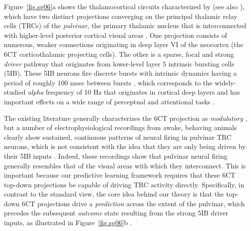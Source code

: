 \documentclass[11pt,twoside]{article}
\newif\myifpdf
\begin{document}

Figure~\ref{fig.sg06}a shows the thalamocortical circuits characterized by \citet{ShermanGuillery06} (see also \citealp{ShermanGuillery13,UsreySherman18}), which have two distinct projections converging on the principal thalamic relay cells (TRCs) of the \emph{pulvinar}, the primary thalamic nucleus that is interconnected with higher-level posterior cortical visual areas \citep{Shipp03,ArcaroPinskKastner15,HalassaKastner17}.  One projection consists of numerous, weaker connections originating in deep layer VI of the neocortex (the 6CT corticothalamic projecting cells).  The other is a sparse, focal \citep{Rockland98a,Rockland96} and strong \emph{driver} pathway that originates from lower-level layer 5 intrinsic bursting cells (5IB).  These 5IB neurons fire discrete bursts with intrinsic dynamics having a period of roughly 100 msec between bursts \citep{ConnorsGutnickPrince82,SilvaAmitaiConnors91,LarkumZhuSakmann99,FranceschettiGuatteoPanzicaEtAl95,SaalmannPinskWangEtAl12}, which corresponds to the widely-studied \emph{alpha} frequency of 10 Hz that originates in cortical deep layers and has important effects on a wide range of perceptual and attentional tasks \citep{BuffaloFriesLandmanEtAl11,VanRullenKoch03,MathewsonGrattonFabianiEtAl09,JensenBonnefondVanRullen12,ClaytonYeungKadosh18}.

The existing literature generally characterizes the 6CT projection as \emph{modulatory} \citep{ShermanGuillery13,UsreySherman18}, but a number of electrophysiological recordings from awake, behaving animals clearly show sustained, continuous patterns of neural firing in pulvinar TRC neurons, which is not consistent with the idea that they are only being driven by their 5IB inputs \citep{Bender82,PetersenRobinsonKeys85,BenderYouakim01,Robinson93,SaalmannPinskWangEtAl12,KomuraNikkuniHirashimaEtAl13,ZhouSchaferDesimone16}.  Indeed, these recordings show that pulvinar neural firing generally resembles that of the visual areas with which they interconnect.  This is important because our predictive learning framework requires that these 6CT top-down projections be capable of driving TRC activity directly.  Specifically, in contrast to the standard view, the core idea behind our theory is that the top-down 6CT projections drive a \emph{prediction} across the extent of the pulvinar, which precedes the subsequent \emph{outcome} state resulting from the strong 5IB driver inputs, as illustrated in Figure~\ref{fig.sg06}b \citep{KachergisWyatteOReillyEtAl14,OReillyWyatteRohrlich14,OReillyWyatteRohrlich17}.  
\end{document}
